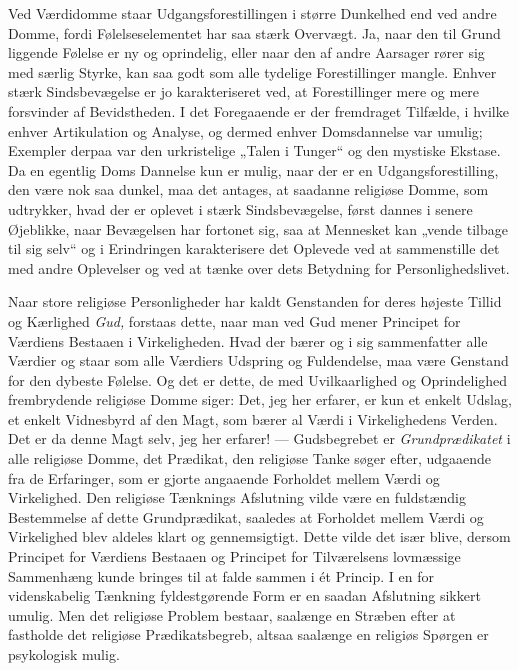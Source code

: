 \documentclass[12pt,a4paper,openany]{book}
\newcommand{\opage}[1]{\marginnote{\footnotesize\textit{[#1]}}}
\begin{document}
Ved Værdidomme staar Udgangsforestillingen i større Dunkelhed end ved
andre Domme, fordi Følelseselementet har saa stærk Overvægt. Ja, naar
den til Grund liggende Følelse er ny og oprindelig, eller naar den af
andre Aarsager rører sig med særlig Styrke, kan saa godt som alle
tydelige Forestillinger mangle. Enhver stærk Sindsbevægelse er jo
karakteriseret ved, at Forestillinger mere og mere forsvinder af
Bevidstheden. I det Foregaaende er der fremdraget Tilfælde, i hvilke
enhver Artikulation og Analyse, og dermed enhver Domsdannelse var
umulig; Exempler derpaa var den urkristelige „Talen i Tunger“ og den
mystiske Ekstase. Da en egentlig Doms Dannelse kun er mulig, naar der er
en Udgangsforestilling, den være nok saa dunkel, maa det antages, at
saadanne religiøse Domme, som udtrykker, hvad der er oplevet i stærk
Sindsbevægelse, først dannes i senere Øjeblikke, naar Bevægelsen har
fortonet sig, saa at Mennesket kan „vende tilbage til sig selv“ og i
Erindringen karakterisere det Oplevede ved at sammenstille det med andre
Oplevelser og ved at tænke over dets Betydning for Personlighedslivet.

Naar store religiøse Personligheder har kaldt Genstanden for deres
højeste Tillid og Kærlighed \textit{Gud,} forstaas dette, naar man ved
Gud mener Principet for Værdiens Bestaaen i Virkeligheden. Hvad der
bærer og i sig sammenfatter alle Værdier og staar som alle Værdiers
Udspring og Fuldendelse, maa være Genstand for den dybeste Følelse. Og
det er dette, de med Uvilkaarlighed og Oprindelighed frembrydende
religiøse Domme siger: Det, jeg her erfarer, er kun et enkelt Udslag, et
enkelt Vidnesbyrd af den Magt, som bærer al Værdi i Virkelighedens
Verden. Det er da denne Magt selv, jeg her erfarer! --- Gudsbegrebet er
\textit{Grundprædikatet} i alle religiøse Domme, det Prædikat, den
religiøse Tanke søger efter, udgaaende fra de Erfaringer, som er gjorte
angaaende Forholdet mellem Værdi og Virkelighed. Den religiøse
\opage{124}Tænknings Afslutning vilde være en fuldstændig Bestemmelse af
dette Grundprædikat, saaledes at Forholdet mellem Værdi og Virkelighed
blev aldeles klart og gennemsigtigt. Dette vilde det især blive, dersom
Principet for Værdiens Bestaaen og Principet for Tilværelsens lovmæssige
Sammenhæng kunde bringes til at falde sammen i ét Princip. I en for
videnskabelig Tænkning fyldestgørende Form er en saadan Afslutning
sikkert umulig. Men det religiøse Problem bestaar, saalænge en Stræben
efter at fastholde det religiøse Prædikatsbegreb, altsaa saalænge en
religiøs Spørgen er psykologisk mulig.
\end{document}
